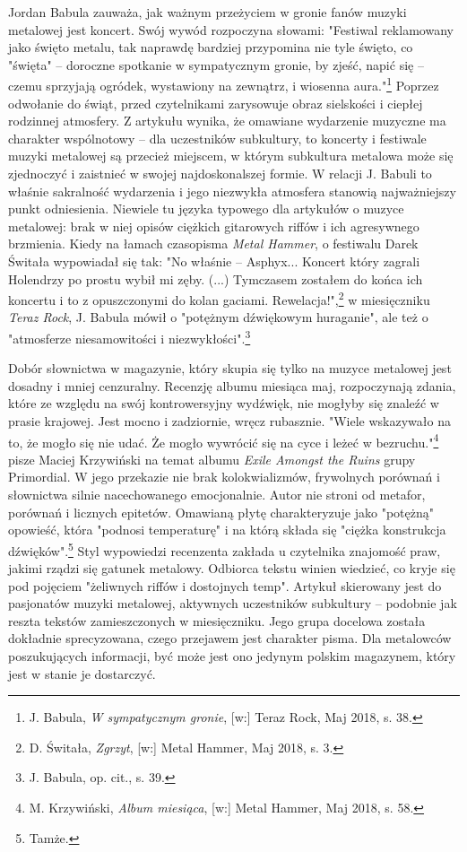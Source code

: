 \documentclass[12pt, a4paper, titlepage]{report}
\begin{document}
Jordan Babula zauważa, jak ważnym przeżyciem w gronie fanów muzyki metalowej jest koncert. Swój wywód rozpoczyna słowami: "Festiwal reklamowany jako święto metalu, tak naprawdę bardziej przypomina nie tyle święto, co "święta" -- doroczne spotkanie w sympatycznym gronie, by zjeść, napić się -- czemu sprzyjają ogródek, wystawiony na zewnątrz, i wiosenna aura."\footnote{J. Babula, \textit{W sympatycznym gronie}, [w:] Teraz Rock, Maj 2018, s. 38.} Poprzez odwołanie do świąt, przed czytelnikami zarysowuje obraz sielskości i ciepłej rodzinnej atmosfery. Z artykułu wynika, że omawiane wydarzenie muzyczne ma charakter wspólnotowy -- dla uczestników subkultury, to koncerty i festiwale muzyki metalowej są przecież miejscem, w którym subkultura metalowa może się zjednoczyć i zaistnieć w swojej najdoskonalszej formie. W relacji J. Babuli to właśnie sakralność wydarzenia i jego niezwykła atmosfera stanowią najważniejszy punkt odniesienia. Niewiele tu języka typowego dla artykułów o muzyce metalowej: brak w niej opisów ciężkich gitarowych riffów i ich agresywnego brzmienia. Kiedy na łamach czasopisma \textit{Metal Hammer}, o festiwalu Darek Świtała wypowiadał się tak: "No właśnie – Asphyx... Koncert który zagrali Holendrzy po prostu wybił mi zęby. (...) Tymczasem zostałem do końca ich koncertu i to z opuszczonymi do kolan gaciami. Rewelacja!",\footnote{D. Świtała, \textit{Zgrzyt}, [w:] Metal Hammer, Maj 2018, s. 3.} w miesięczniku \textit{Teraz Rock}, J. Babula mówił o "potężnym dźwiękowym huraganie", ale też o "atmosferze niesamowitości i niezwykłości".\footnote{J. Babula, op. cit., s. 39.}

Dobór słownictwa w magazynie, który skupia się tylko na muzyce metalowej jest dosadny i mniej cenzuralny. Recenzję albumu miesiąca maj, rozpoczynają zdania, które ze względu na swój kontrowersyjny wydźwięk, nie mogłyby się znaleźć w prasie krajowej. Jest mocno i zadziornie, wręcz rubasznie. "Wiele wskazywało na to, że mogło się nie udać. Że mogło wywrócić się na cyce i leżeć w bezruchu."\footnote{M. Krzywiński, \textit{Album miesiąca}, [w:] Metal Hammer, Maj 2018, s. 58.} pisze Maciej Krzywiński na temat albumu \textit{Exile Amongst the Ruins} grupy Primordial. W jego przekazie nie brak kolokwializmów, frywolnych porównań i słownictwa silnie nacechowanego emocjonalnie. Autor nie stroni od metafor, porównań i licznych epitetów. Omawianą płytę charakteryzuje jako "potężną" opowieść, która "podnosi temperaturę" i na którą składa się "ciężka konstrukcja dźwięków".\footnote{Tamże.} Styl wypowiedzi recenzenta zakłada u czytelnika znajomość praw, jakimi rządzi się gatunek metalowy. Odbiorca tekstu winien wiedzieć, co kryje się pod pojęciem "żeliwnych riffów i dostojnych temp". Artykuł skierowany jest do pasjonatów muzyki metalowej, aktywnych uczestników subkultury -- podobnie jak reszta tekstów zamieszczonych w miesięczniku. Jego grupa docelowa została dokładnie sprecyzowana, czego przejawem jest charakter pisma. Dla metalowców poszukujących informacji, być może jest ono jedynym polskim magazynem, który jest w stanie je dostarczyć.
\end{document}
